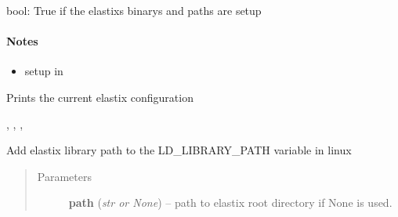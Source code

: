 \documentclass[letterpaper,10pt,english]{sphinxmanual}
\begin{document}

\begin{fulllineitems}
\label{api/ClearMap.Alignment:ClearMap.Alignment.Elastix.Initialized}
bool: True if the elastixs binarys and paths are setup
\paragraph{Notes}
\begin{itemize}
\item {} 
setup in {\hyperref[api/ClearMap.Alignment:ClearMap.Alignment.Elastix.initializeElastix]{\emph{}}}

\end{itemize}

\end{fulllineitems}


\begin{fulllineitems}
\label{api/ClearMap.Alignment:ClearMap.Alignment.Elastix.printSettings}
Prints the current elastix configuration




{\hyperref[api/ClearMap.Alignment:ClearMap.Alignment.Elastix.ElastixBinary]{\emph{}}}, {\hyperref[api/ClearMap.Alignment:ClearMap.Alignment.Elastix.ElastixLib]{\emph{}}}, {\hyperref[api/ClearMap.Alignment:ClearMap.Alignment.Elastix.TransformixBinary]{\emph{}}}, {\hyperref[api/ClearMap.Alignment:ClearMap.Alignment.Elastix.Initialized]{\emph{}}}



\end{fulllineitems}


\begin{fulllineitems}
\label{api/ClearMap.Alignment:ClearMap.Alignment.Elastix.setElastixLibraryPath}
Add elastix library path to the LD\_LIBRARY\_PATH variable in linux
\begin{quote}\begin{description}
\item[{Parameters}] \leavevmode
\textbf{path} (\emph{str or None}) --
path to elastix root directory if None {\hyperref[api/ClearMap.Settings:ClearMap.Settings.ElastixPath]{\emph{}}} is used.

\end{description}\end{quote}

\end{fulllineitems}
\end{document}
